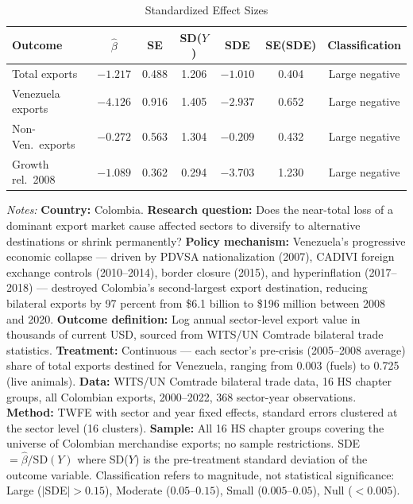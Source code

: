 \begin{table}[!htbp]
\centering
\begin{threeparttable}
\caption{Standardized Effect Sizes}
\label{tab:sde}
\small
\begin{tabular}{lcccccc}
\toprule
Outcome & $\hat{\beta}$ & SE & SD($Y$) & SDE & SE(SDE) & Classification \\
\midrule
Total exports & $-1.217$ & 0.488 & 1.206 & $-1.010$ & 0.404 & Large negative \\
Venezuela exports & $-4.126$ & 0.916 & 1.405 & $-2.937$ & 0.652 & Large negative \\
Non-Ven.\ exports & $-0.272$ & 0.563 & 1.304 & $-0.209$ & 0.432 & Large negative \\
Growth rel.\ 2008 & $-1.089$ & 0.362 & 0.294 & $-3.703$ & 1.230 & Large negative \\
\bottomrule
\end{tabular}
\begin{tablenotes}[flushleft]
\footnotesize
\item \textit{Notes:}
\textbf{Country:} Colombia.
\textbf{Research question:} Does the near-total loss of a dominant export market cause affected sectors to diversify to alternative destinations or shrink permanently?
\textbf{Policy mechanism:} Venezuela's progressive economic collapse --- driven by PDVSA nationalization (2007), CADIVI foreign exchange controls (2010--2014), border closure (2015), and hyperinflation (2017--2018) --- destroyed Colombia's second-largest export destination, reducing bilateral exports by 97 percent from \$6.1 billion to \$196 million between 2008 and 2020.
\textbf{Outcome definition:} Log annual sector-level export value in thousands of current USD, sourced from WITS/UN Comtrade bilateral trade statistics.
\textbf{Treatment:} Continuous --- each sector's pre-crisis (2005--2008 average) share of total exports destined for Venezuela, ranging from 0.003 (fuels) to 0.725 (live animals).
\textbf{Data:} WITS/UN Comtrade bilateral trade data, 16 HS chapter groups, all Colombian exports, 2000--2022, 368 sector-year observations.
\textbf{Method:} TWFE with sector and year fixed effects, standard errors clustered at the sector level (16 clusters).
\textbf{Sample:} All 16 HS chapter groups covering the universe of Colombian merchandise exports; no sample restrictions.
SDE $= \hat{\beta} / \text{SD}(Y)$ where SD($Y$) is the pre-treatment standard deviation of the outcome variable.
Classification refers to magnitude, not statistical significance: Large ($|$SDE$| > 0.15$), Moderate ($0.05$--$0.15$), Small ($0.005$--$0.05$), Null ($< 0.005$).
\end{tablenotes}
\end{threeparttable}
\end{table}
